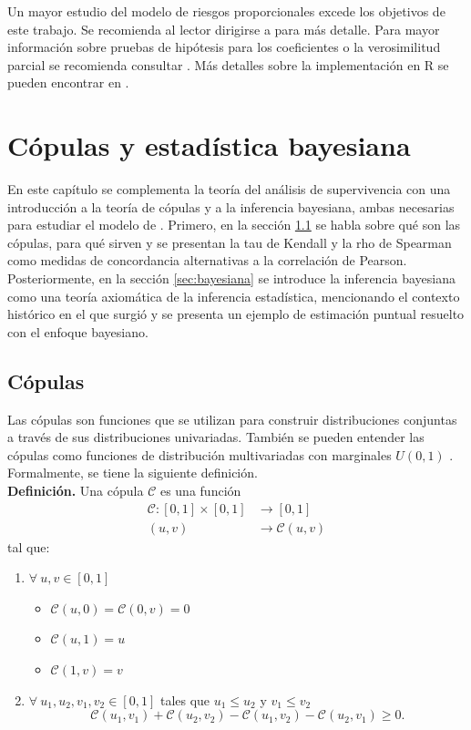 \documentclass[11pt,a4paper]{article}
\begin{document}
Un mayor estudio del modelo de riesgos proporcionales excede los objetivos de este trabajo. Se recomienda al lector dirigirse a \citet{cox} para más detalle. Para mayor información sobre pruebas de hipótesis para los coeficientes o la verosimilitud parcial se recomienda consultar \citet{klein}. Más detalles sobre la implementación en R se pueden encontrar en \citet{moore}.
\newpage

\section{Cópulas y estadística bayesiana}

En este capítulo se complementa la teoría del análisis de supervivencia con una introducción a la teoría de cópulas y a la inferencia bayesiana, ambas necesarias para estudiar el modelo de \citet{nieto}. Primero, en la sección \ref{sec_copulas} se habla sobre qué son las cópulas, para qué sirven y se presentan la tau de Kendall y la rho de Spearman como medidas de concordancia alternativas a la correlación de Pearson. Posteriormente, en la sección \ref{sec:bayesiana} se introduce la inferencia bayesiana como una teoría axiomática de la inferencia estadística, mencionando el contexto histórico en el que surgió y se presenta un ejemplo de estimación puntual resuelto con el enfoque bayesiano.\\

\label{cap:cop}
\subsection{Cópulas} \label{sec_copulas}

Las cópulas son funciones que se utilizan para construir distribuciones conjuntas a través de sus distribuciones univariadas. También se pueden entender las cópulas como funciones de distribución multivariadas con marginales $U(0, 1)$ \citep{nelsen}. Formalmente, se tiene la siguiente definición.\\

\textbf{Definición.} Una cópula $\mathcal{C}$ es una función 
\begin{align*}
\mathcal{C}: [0,1]\times[0,1]&\to [0,1]\\
(u,v) &\to \mathcal{C}(u,v)
\end{align*} tal que:
\begin{enumerate}
\item $\forall \ u,v \in [0,1]$
\begin{itemize}
\item $\mathcal{C} (u,0) = \mathcal{C}(0,v) = 0$
\item $\mathcal{C}(u,1) = u$
\item $\mathcal{C}(1, v) = v$
\end{itemize}
\item $\forall \ u_1, u_2, v_1, v_2 \in [0,1]$ tales que $u_1 \leq u_2$ y $v_1 \leq v_2$  $$\mathcal{C} (u_1,v_1)+\mathcal{C} (u_2,v_2) - \mathcal{C}(u_1,v_2) - \mathcal{C}(u_2,v_1)\geq 0.$$\\
\end{enumerate}
\end{document}
